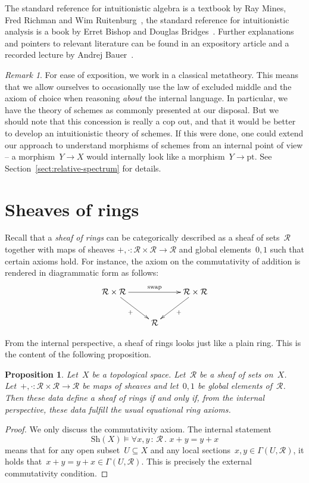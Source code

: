 \documentclass[10pt]{amsart}
\theoremstyle{definition}
\theoremstyle{plain}
\newtheorem{prop}[defn]{Proposition}
\theoremstyle{remark}
\newtheorem{rem}[defn]{Remark}
\newcommand{\R}{\mathcal{R}}
\newcommand{\Sh}{\mathrm{Sh}}
\newcommand{\pt}{\mathrm{pt}}
\newcommand{\?}{\,{:}\,}
\renewcommand{\_}{\mathpunct{.}\,}
\begin{document}
The standard reference for intuitionistic algebra is a textbook by Ray Mines,
Fred Richman and Wim
Ruitenburg~\cite{mines-richman-ruitenburg:constructive-algebra}, the standard
reference for intuitionistic analysis is a book by Erret Bishop and Douglas
Bridges~\cite{bishop-bridges:constructive-analysis}. Further explanations and
pointers to relevant literature can be found in an expository article and a
recorded lecture by Andrej Bauer~\cite{bauer:int-mathematics,bauer:video}.

\begin{rem}For ease of exposition, we work in a classical metatheory. This
means that we allow ourselves to occasionally use the law of excluded middle
and the axiom of choice when reasoning \emph{about} the internal language. In
particular, we have the theory of schemes as commonly presented at our
disposal. But we should note that this concession is really a cop out, and that
it would be better to develop an intuitionistic theory of schemes. If this were
done, one could extend our approach to understand morphisms of schemes from an
internal point of view -- a morphism~$Y \to X$ would internally look like a
morphism~$Y \to \pt$. See Section~\ref{sect:relative-spectrum} for details.\end{rem}


\section{Sheaves of rings}

Recall that a \emph{sheaf of rings} can be categorically described as a
sheaf of sets~$\R$ together with maps of sheaves $+, \cdot : \R \times \R \to
\R$ and global elements~$0, 1$ such that certain axioms hold. For instance, the
axiom on the commutativity of addition is rendered in diagrammatic form as
follows:
\[ \xymatrix{
  \R \times \R \ar[rr]^{\mathrm{swap}} \ar[rd]_{+} && \R \times \R \ar[ld]^{+} \\
  & \R
} \]

From the internal perspective, a sheaf of rings looks just like a plain ring.
This is the content of the following proposition.

\begin{prop}\label{prop:rings-internally}
Let~$X$ be a topological space. Let~$\R$ be a sheaf of sets on~$X$.
Let~$+, \cdot : \R \times \R \to \R$ be maps of sheaves and let~$0, 1$ be
global elements of~$\R$. Then these data define a sheaf of rings if and only
if, from the internal perspective, these data fulfill the usual equational ring
axioms.\end{prop}
\begin{proof}We only discuss the commutativity axiom. The internal statement
\[ \Sh(X) \models \forall x,y\?\R\_ x + y = y + x \]
means that for any open subset~$U \subseteq X$ and any local sections~$x,y \in
\Gamma(U,\R)$, it holds that~$x + y = y + x \in \Gamma(U,\R)$. This is
precisely the external commutativity condition.
\end{proof}
\end{document}
